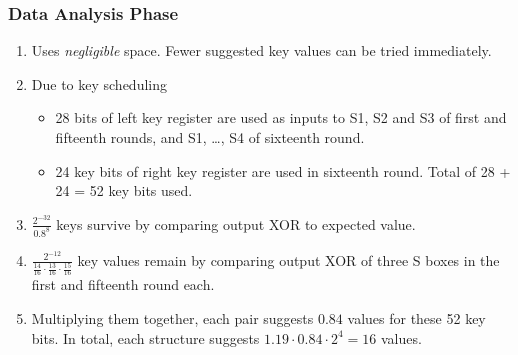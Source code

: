 \documentclass{beamer}
\begin{document}
    \begin{frame}
        \frametitle{Data Analysis Phase}
        \begin{enumerate}
            \item<1-> Uses \emph{negligible} space. Fewer suggested key values
            can be tried immediately.
            \item<2-> Due to key scheduling
            \begin{itemize}
                \item<3-> 28 bits of left key register are used as inputs to S1,
                S2 and S3 of first and fifteenth rounds, and S1, \dots, S4 of
                sixteenth round.
                \item<4-> 24 key bits of right key register are used in
                sixteenth round. Total of 28 + 24 = 52 key bits used.
            \end{itemize}
            \item<5-> \(\frac{2^{-32}}{0.8^8}\) keys survive by comparing output
            XOR to expected value.
            \item<6-> \(\frac{2^{-12}}{\frac{14}{16} \cdot \frac{13}{16} \cdot
            \frac{15}{16}}\) key values remain by comparing output XOR of three
            S boxes in the first and fifteenth round each.
            \item<7-> Multiplying them together, each pair suggests \(0.84\)
            values for these 52 key bits. In total, each structure suggests
            \(1.19 \cdot 0.84 \cdot 2^4 = 16\) values.
        \end{enumerate}
    \end{frame}
\end{document}
